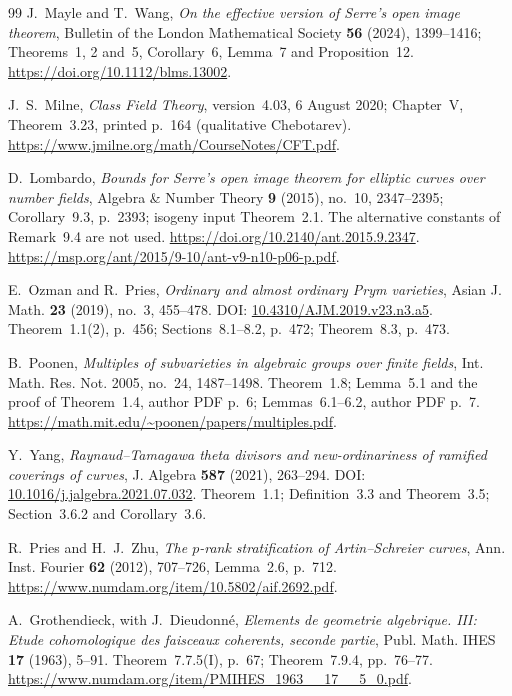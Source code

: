 \begin{thebibliography}{99}
J.~Mayle and T.~Wang, \emph{On the effective version of Serre's
open image theorem}, Bulletin of the London Mathematical Society
\textbf{56} (2024), 1399--1416; Theorems~1, 2 and~5,
Corollary~6, Lemma~7 and Proposition~12.
\url{https://doi.org/10.1112/blms.13002}.

J.~S.~Milne, \emph{Class Field Theory}, version~4.03,
6 August 2020; Chapter~V, Theorem~3.23, printed p.~164
(qualitative Chebotarev).
\url{https://www.jmilne.org/math/CourseNotes/CFT.pdf}.

D.~Lombardo, \emph{Bounds for Serre's open image theorem for elliptic
curves over number fields}, Algebra \& Number Theory \textbf{9}
(2015), no.~10, 2347--2395; Corollary~9.3, p.~2393;
isogeny input Theorem~2.1. The alternative constants of Remark~9.4
are not used.
\url{https://doi.org/10.2140/ant.2015.9.2347}.
\url{https://msp.org/ant/2015/9-10/ant-v9-n10-p06-p.pdf}.

E.~Ozman and R.~Pries,
\emph{Ordinary and almost ordinary Prym varieties},
Asian J. Math. \textbf{23} (2019), no.~3, 455--478.
DOI: \href{https://doi.org/10.4310/AJM.2019.v23.n3.a5}{10.4310/AJM.2019.v23.n3.a5}.
Theorem~1.1(2), p.~456; Sections~8.1--8.2, p.~472;
Theorem~8.3, p.~473.

B.~Poonen,
\emph{Multiples of subvarieties in algebraic groups over finite fields},
Int. Math. Res. Not. 2005, no.~24, 1487--1498.
Theorem~1.8; Lemma~5.1 and the proof of Theorem~1.4, author PDF p.~6;
Lemmas~6.1--6.2, author PDF p.~7.
\url{https://math.mit.edu/~poonen/papers/multiples.pdf}.

Y.~Yang,
\emph{Raynaud--Tamagawa theta divisors and new-ordinariness of
ramified coverings of curves},
J. Algebra \textbf{587} (2021), 263--294.
DOI: \href{https://doi.org/10.1016/j.jalgebra.2021.07.032}{10.1016/j.jalgebra.2021.07.032}.
Theorem~1.1; Definition~3.3 and Theorem~3.5;
Section~3.6.2 and Corollary~3.6.

R.~Pries and H.~J.~Zhu, \emph{The $p$-rank stratification of
Artin--Schreier curves}, Ann. Inst. Fourier \textbf{62} (2012),
707--726, Lemma~2.6, p.~712.
\url{https://www.numdam.org/item/10.5802/aif.2692.pdf}.

A.~Grothendieck, with J.~Dieudonn\'e, \emph{Elements de geometrie
algebrique. III: Etude cohomologique des faisceaux coherents,
seconde partie}, Publ. Math. IHES \textbf{17} (1963), 5--91.
Theorem~7.7.5(I), p.~67; Theorem~7.9.4, pp.~76--77.
\url{https://www.numdam.org/item/PMIHES_1963__17__5_0.pdf}.


\end{thebibliography}
